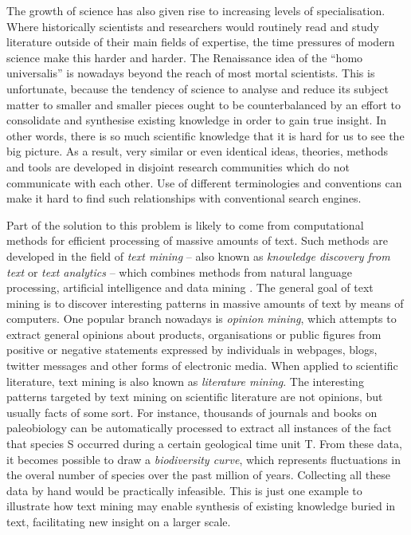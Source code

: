 The growth of science has also given rise to increasing levels of specialisation.
Where historically scientists and researchers would routinely read and study literature outside of their main fields of expertise, the time pressures of modern science make this harder and harder.
The Renaissance idea of the ``homo universalis'' is nowadays beyond the reach of most mortal scientists.
This is unfortunate, because the tendency of science to analyse and reduce its subject matter to smaller and smaller pieces ought to be counterbalanced by an effort to consolidate and synthesise existing knowledge in order to gain true insight.    
In other words, there is so much scientific knowledge that it is hard for us to see the big picture.
As a result, very similar or even identical ideas, theories, methods and tools are developed in disjoint research communities which do not communicate with each other.
Use of different terminologies and conventions can make it hard to find such relationships with conventional search engines.  

Part of the solution to this problem is likely to come from computational methods for efficient processing of massive amounts of text.
Such methods are developed in the field of \emph{text mining} -- also known as \emph{knowledge discovery from text} or \emph{text analytics} -- which combines methods from natural language processing, artificial intelligence and data mining \citep{Aggarwal2012Mining,Weiss2012Fundamentals}.
The general goal of text mining is to discover interesting patterns in massive amounts of text by means of computers.
One popular branch nowadays is \emph{opinion mining}, which attempts to extract general opinions about products, organisations or public figures from positive or negative statements expressed by individuals in webpages, blogs, twitter messages and other forms of electronic media.
When applied to scientific literature, text mining is also known as \emph{literature mining}. The interesting patterns targeted by text mining on scientific literature are not opinions, but usually facts of some sort.
For instance, thousands of journals and books on paleobiology can be automatically processed to extract all instances of the fact that species S occurred during a certain geological time unit T.
From these data, it becomes possible to draw a \emph{biodiversity curve}, which represents fluctuations in the overal number of species over the past million of years.
Collecting all these data by hand would be practically infeasible.
This is just one example to illustrate how text mining may enable synthesis of existing knowledge buried in text, facilitating new insight on a larger scale.  

